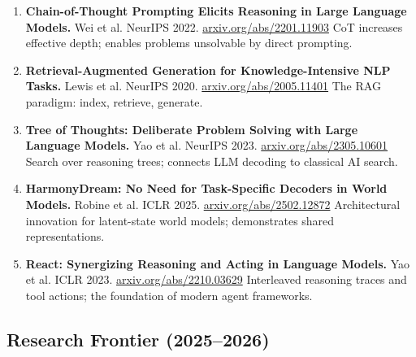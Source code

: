 \documentclass[11pt,a4paper]{article}
\begin{document}
\begin{enumerate}[leftmargin=2em,label=(\arabic*),start=16]
	\item \textbf{Chain-of-Thought Prompting Elicits Reasoning in Large Language Models.}
	      Wei et al. NeurIPS 2022. \href{https://arxiv.org/abs/2201.11903}{arxiv.org/abs/2201.11903}
	      \newline CoT increases effective depth; enables problems unsolvable by direct prompting.

	\item \textbf{Retrieval-Augmented Generation for Knowledge-Intensive NLP Tasks.}
	      Lewis et al. NeurIPS 2020. \href{https://arxiv.org/abs/2005.11401}{arxiv.org/abs/2005.11401}
	      \newline The RAG paradigm: index, retrieve, generate.

	\item \textbf{Tree of Thoughts: Deliberate Problem Solving with Large Language Models.}
	      Yao et al. NeurIPS 2023. \href{https://arxiv.org/abs/2305.10601}{arxiv.org/abs/2305.10601}
	      \newline Search over reasoning trees; connects LLM decoding to classical AI search.

	\item \textbf{HarmonyDream: No Need for Task-Specific Decoders in World Models.}
	      Robine et al. ICLR 2025. \href{https://arxiv.org/abs/2502.12872}{arxiv.org/abs/2502.12872}
	      \newline Architectural innovation for latent-state world models; demonstrates shared representations.

	\item \textbf{React: Synergizing Reasoning and Acting in Language Models.}
	      Yao et al. ICLR 2023. \href{https://arxiv.org/abs/2210.03629}{arxiv.org/abs/2210.03629}
	      \newline Interleaved reasoning traces and tool actions; the foundation of modern agent frameworks.
\end{enumerate}

\subsection*{Research Frontier (2025--2026)}
\end{document}
